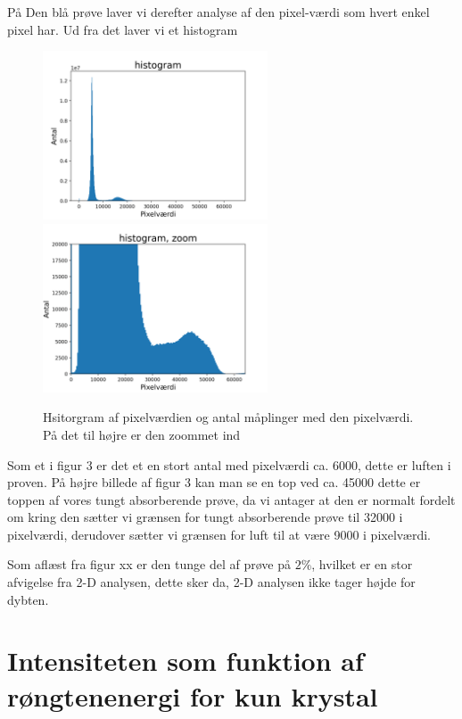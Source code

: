 \documentclass[a4paper,twoside]{article}
\begin{document}
På Den blå prøve laver vi derefter analyse af den pixel-værdi som hvert enkel pixel har. Ud fra det laver vi et histogram
\begin{figure}[H]
\begin{centering}
\includegraphics[height=5cm]{index ikke_xoom.png}
\includegraphics[height=5cm]{index_zoom.png}
\hspace{1cm}
\par\end{centering}
\caption{\label{cap:2ien} Hsitorgram  af pixelværdien og antal måplinger med den pixelværdi. På det til højre er den zoommet ind}
\end{figure}
Som et i figur 3 er det et en stort antal med pixelværdi ca. 6000, dette er luften i proven. På højre billede af figur 3 kan man se en top ved ca. 45000 dette er toppen af vores tungt absorberende prøve, da vi antager at den er normalt fordelt om kring den sætter vi grænsen for tungt absorberende prøve til 32000 i pixelværdi, derudover sætter vi grænsen for luft til at være 9000 i pixelværdi. 


Som aflæst fra figur xx er den tunge del af prøve på $2\%$, hvilket er en stor afvigelse fra 2-D analysen, dette sker da, 2-D analysen ikke tager højde for dybten.  

\section{Intensiteten som funktion af røngtenenergi for kun krystal}
\end{document}
